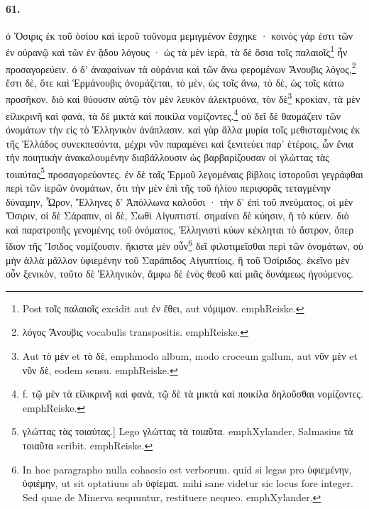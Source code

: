 \documentclass[a4paper, 11pt, oneside, polutonikogreek, german]{article}
\begin{document}
\paragraph{61.}
ὁ Ὄσιρις ἐκ τοῦ ὁσίου καὶ ἱεροῦ τοὔνομα μεμιγμένον ἔσχηκε · κοινὸς γάρ ἐστι τῶν ἐν οὐρανῷ καὶ τῶν ἐν ᾅδου λόγους · ὡς τὰ μὲν ἱερὰ, τὰ δὲ ὅσια τοῖς παλαιοῖς\footnote{Post τοῖς παλαιοῖς excidit aut ἐν ἔθει, aut νόμιμον. emph{Reiske.}} ἦν προσαγορεύειν. ὁ δ' ἀναφαίνων τὰ οὐράνια καὶ τῶν ἄνω φερομένων Ἄνουβις λόγος,\footnote{λόγος Ἄνουβις vocabulis transpositis. emph{Reiske.}} ἔστι δὲ, ὅτε καὶ Ἑρμάνουβις ὀνομάζεται, τὸ μὲν, ὡς τοῖς ἄνω, τὸ δὲ, ὡς τοῖς κάτω προσῆκον. διὸ καὶ θύουσιν αὐτῷ τὸν μὲν λευκὸν ἀλεκτρυόνα, τὸν δὲ\footnote{Aut τὸ μὲν et τὸ δὲ, emph{modo album, modo croceum gallum}, aut νῦν μὲν et νῦν δὲ, eodem sensu. emph{Reiske.}} κροκίαν, τὰ μὲν εἰλικρινῆ καὶ φανὰ, τὰ δὲ μικτὰ καὶ ποικίλα νομίζοντες.\footnote{f. τῷ μὲν τὰ εἰλικρινῆ καὶ φανὰ, τῷ δὲ τὰ μικτὰ καὶ ποικίλα δηλοῦσθαι νομίζοντες. emph{Reiske.}} οὐ δεῖ δὲ θαυμάζειν τῶν ὀνομάτων τὴν εἰς τὸ Ἑλληνικὸν ἀνάπλασιν. καὶ γὰρ ἄλλα μυρία τοῖς μεθισταμένοις ἐκ τῆς Ἑλλάδος συνεκπεσόντα, μέχρι νῦν παραμένει καὶ ξενιτεύει παρ' ἑτέροις, ὧν ἔνια τὴν ποιητικὴν ἀνακαλουμένην διαβάλλουσιν ὡς βαρβαρίζουσαν οἱ γλώττας τὰς τοιαύτας\footnote{γλώττας τὰς τοιαύτας.] Lego γλώττας τὰ τοιαῦτα. emph{Xylander.} Salmasius τὰ τοιαῦτα scribit. emph{Reiske.}} προσαγορεύοντες. ἐν δὲ ταῖς Ἑρμοῦ λεγομέναις βίβλοις ἱστοροῦσι γεγράφθαι περὶ τῶν ἱερῶν ὀνομάτων, ὅτι τὴν μὲν ἐπὶ τῆς τοῦ ἡλίου περιφορᾶς τεταγμένην δύναμην, Ὧρον, Ἕλληνες δ' Ἀπόλλωνα καλοῦσι · τὴν δ' ἐπὶ τοῦ πνεύματος, οἱ μὲν Ὄσιριν, οἱ δὲ Σάραπιν, οἱ δὲ, Σωθὶ Αἰγυπτιστί. σημαίνει δὲ κύησιν, ἢ τὸ κύειν. διὸ καὶ παρατροπῆς γενομένης τοῦ ὀνόματος, Ἑλληνιστὶ κύων κέκληται τὸ ἄστρον, ὅπερ ἴδιον τῆς Ἴσιδος νομίζουσιν. ἥκιστα μὲν οὖν\footnote{In hoc paragrapho nulla cohaesio est verborum. quid si legas pro ὑφιεμένην, ὑφιέμην, ut sit optatiuus ab ὑφίεμαι. mihi sane videtur sic locus fore integer. Sed quae de Minerva sequuntur, restituere nequeo. emph{Xylander.}} δεῖ φιλοτιμεῖσθαι περὶ τῶν ὀνομάτων, οὐ μὴν ἀλλὰ μᾶλλον ὑφιεμένην τοῦ Σαράπιδος Αἰγυπτίοις, ἢ τοῦ Ὀσίριδος. ἐκεῖνο μὲν οὖν ξενικὸν, τοῦτο δὲ Ἑλληνικὸν, ἄμφω δὲ ἑνὸς θεοῦ καὶ μιᾶς δυνάμεως ἡγούμενος.
\end{document}
